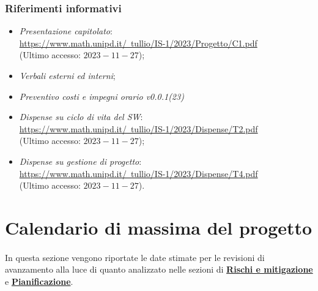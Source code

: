 \documentclass[10pt, a4paper]{article}
\begin{document}
\subsubsection{Riferimenti informativi}
\begin{itemize}
   
    \item \textit{Presentazione capitolato}:\\
    \href{https://www.math.unipd.it/~tullio/IS-1/2023/Progetto/C1.pdf}{https://www.math.unipd.it/~tullio/IS-1/2023/Progetto/C1.pdf}\\
    (Ultimo accesso: $2023-11-27$);   
    
    \item \textit{Verbali esterni ed interni};
    \item \textit{Preventivo costi e impegni orario v0.0.1(23)}
    
    \item \textit{Dispense su ciclo di vita del SW}:\\
    \href{https://www.math.unipd.it/~tullio/IS-1/2023/Dispense/T2.pdf}{https://www.math.unipd.it/~tullio/IS-1/2023/Dispense/T2.pdf}\\
    (Ultimo accesso: $2023-11-27$);
    
    \item  \textit{Dispense su gestione di progetto}:\\
    \href{https://www.math.unipd.it/~tullio/IS-1/2023/Dispense/T4.pdf}{https://www.math.unipd.it/~tullio/IS-1/2023/Dispense/T4.pdf}\\
    (Ultimo accesso: $2023-11-27$).
\end{itemize}
\newpage

\section{Calendario di massima del progetto}
\paragraph{}In questa sezione vengono riportate le date stimate per le revisioni di avanzamento alla luce di quanto analizzato nelle sezioni di \hyperref[section:Rischi]{\textbf{Rischi e mitigazione}} e \hyperref[section:Pianificazione]{\textbf{Pianificazione}}.
\end{document}
